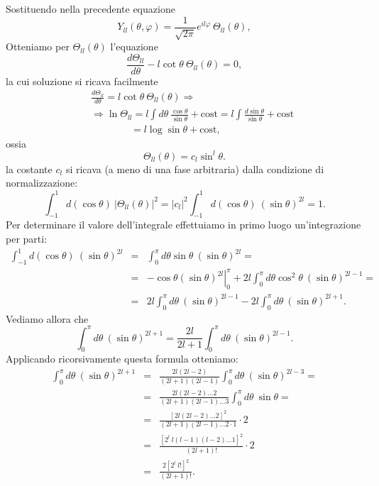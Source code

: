 \documentclass[a4paper,12pt,oneside]{book}
\begin{document}
Sostituendo nella precedente equazione 
\begin{equation}
Y_{ll}(\theta , \varphi ) = \frac{1}{\sqrt{2\pi}}e^{il\varphi}\ \Theta _{ll} (\theta ) ,
\end{equation}
Otteniamo per $\Theta _{ll} (\theta )$ l'equazione
\begin{equation}
\frac{d\Theta _{ll}}{d \theta}-l\cot\theta \ \Theta _{ll} (\theta )=0 ,
\end{equation}
la cui soluzione si ricava facilmente
\begin{eqnarray}
& &\frac{d\Theta _{ll}}{d \theta}=l\cot\theta \ \Theta _{ll} (\theta ) \Rightarrow \nonumber \\
& &\Rightarrow \ln \Theta _{ll} = l \int d\theta \ \frac{\cos \theta}{\sin \theta}+ \textrm{cost} = l \int  \frac{d\sin \theta}{\sin \theta}+ \textrm{cost} \nonumber \\
& & \qquad \qquad = l \log \sin \theta + \textrm{cost} ,
\end{eqnarray}
ossia
\begin{equation}
\Theta _{ll} (\theta )= c_l \sin ^l \theta .
\end{equation}
la costante $c_l$ si ricava (a meno di una fase arbitraria) dalla condizione di normalizzazione:
\begin{equation}
\int _{-1} ^1 d(\cos \theta )\ \vert \Theta _{ll} (\theta ) \vert ^2 = \vert c_l \vert ^2 \int _{-1} ^1 d(\cos \theta )\ \left( \sin \theta \right) ^{2l} =1.
\end{equation}
Per determinare il valore dell'integrale effettuiamo in primo luogo un'integrazione per parti:
\begin{eqnarray}
\int _{-1} ^1 d(\cos \theta )\ (\sin \theta ) ^{2l} &=& \int _{0} ^{\pi} d\theta \sin \theta\ (\sin \theta ) ^{2l} = \nonumber \\
&=& \left. -\cos \theta (\sin \theta ) ^{2l} \right\vert _0 ^{\pi} +2l\int _{0} ^{\pi} d\theta \cos ^2 \theta \ (\sin \theta ) ^{2l-1} = \nonumber \\
&=&  2l\int _{0} ^{\pi} d\theta \ (\sin \theta ) ^{2l-1} - 2l\int _{0} ^{\pi} d\theta  \ (\sin \theta ) ^{2l+1} .
\end{eqnarray}
Vediamo allora che 
\begin{equation}
\int _{0} ^{\pi} d\theta \ (\sin \theta ) ^{2l+1}=\frac{2l}{2l+1} \int _{0} ^{\pi} d\theta \ (\sin \theta ) ^{2l-1}.
\end{equation}
Applicando ricorsivamente questa formula otteniamo:
\begin{eqnarray}
\int _{0} ^{\pi} d\theta \ (\sin \theta ) ^{2l+1} & = & \frac{2l(2l-2)}{(2l+1)(2l-1)} \int _{0} ^{\pi} d\theta \ (\sin \theta ) ^{2l-3} = \nonumber \\
&=& \frac{2l(2l-2)\dots 2}{(2l+1)(2l-1)\dots 3} \int _{0} ^{\pi} d\theta \ \sin \theta =\nonumber \\
&=& \frac{[2l(2l-2)\dots 2]^2}{(2l+1)(2l-1)\dots 2\cdot 1}\cdot 2 \nonumber \\
& = &  \frac{[2^l\ l(l-1)(l-2)\dots 1]^2}{(2l+1)!}\cdot 2 \nonumber \\
&=& \frac{2[2^l\ l!]^2}{(2l+1)!}.
\end{eqnarray}
\end{document}
